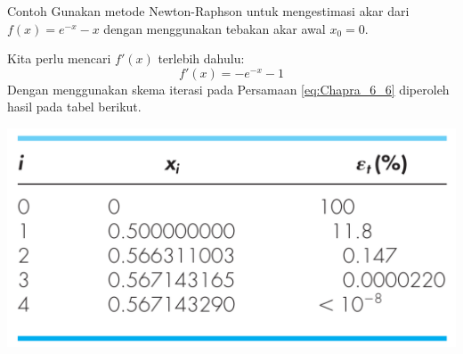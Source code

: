 \begin{frame}
\fontsize{10}{11}\selectfont

\begin{block}{Contoh}
Gunakan metode Newton-Raphson untuk mengestimasi akar dari $f(x) = e^{-x} - x$ dengan
menggunakan tebakan akar awal $x_{0} = 0$.
\end{block}

Kita perlu mencari $f'(x)$ terlebih dahulu:
$$
f'(x) = -e^{-x} - 1
$$
Dengan menggunakan skema iterasi pada Persamaan \eqref{eq:Chapra_6_6} diperoleh
hasil pada tabel berikut.

{\centering
\includegraphics[height=0.4\textheight]{../chapra_7th/Chapra_Table_Example_6_3.png}
\par}

\end{frame}



